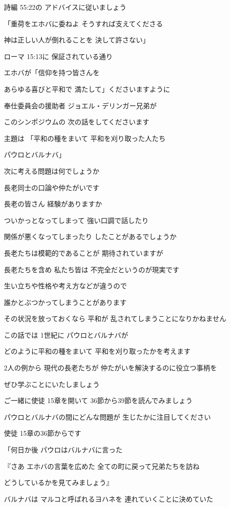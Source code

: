 \documentclass[twocolumn]{jsarticle}
\begin{document}
詩編 55:22の
アドバイスに従いましょう

「重荷をエホバに委ねよ
そうすれば支えてくださる

神は正しい人が倒れることを
決して許さない」

ローマ 15:13に
保証されている通り

エホバが「信仰を持つ皆さんを

あらゆる喜びと平和で
満たして」くださいますように

奉仕委員会の援助者
ジョエル・デリンガー兄弟が

このシンポジウムの
次の話をしてくださいます

主題は 「平和の種をまいて
平和を刈り取った人たち 

パウロとバルナバ」

次に考える問題は何でしょうか

長老同士の口論や仲たがいです

長老の皆さん 経験がありますか

ついかっとなってしまって
強い口調で話したり

関係が悪くなってしまったり
したことがあるでしょうか

長老たちは模範的であることが
期待されていますが

長老たちを含め 私たち皆は
不完全だというのが現実です

生い立ちや性格や考え方などが違うので

誰かとぶつかってしまうことがあります

その状況を放っておくなら 平和が
乱されてしまうことになりかねません

この話では 1世紀に
パウロとバルナバが

どのように平和の種をまいて
平和を刈り取ったかを考えます

2人の例から 現代の長老たちが
仲たがいを解決するのに役立つ事柄を

ぜひ学ぶことにいたしましょう

ご一緒に使徒 15章を開いて
36節から39節を読んでみましょう

パウロとバルナバの間にどんな問題が
生じたかに注目してください

使徒 15章の36節からです

「何日か後 パウロはバルナバに言った

『さあ エホバの言葉を広めた
全ての町に戻って兄弟たちを訪ね

どうしているかを見てみましょう』

バルナバは マルコと呼ばれるヨハネを
連れていくことに決めていた
\end{document}
